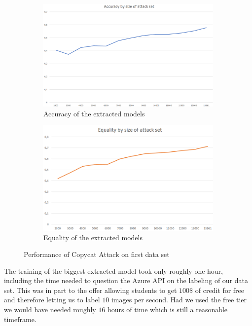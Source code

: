 \documentclass[a4paper,11pt]{article}
\begin{document}
        \begin{figure}[h!]
            \centering
            \begin{subfigure}[c]{0.49\textwidth}
                \centering
                \includegraphics[width=1\textwidth]{exercise_3/paper/images/accuracy_copy_Azure.png}
                \caption{Accuracy of the extracted models}
                \label{fig:Accuracy_Azure}
            \end{subfigure}
            \begin{subfigure}[c]{0.49\textwidth}
                \centering
                \includegraphics[width=1\textwidth]{exercise_3/paper/images/equality_copy_Azure.png}
                \caption{Equality of the extracted models}
                \label{fig:Equality_Azure}
            \end{subfigure}
            \caption{Performance of Copycat Attack on first data set}
            \label{fig:performance-azure}
        \end{figure}
        The training of the biggest extracted model took only roughly one hour, including the time needed to question the Azure API on the labeling of our data set. This was in part to the offer allowing students to get $100$\$ of credit for free and therefore letting us to label $10$ images per second. Had we used the free tier we would have needed roughly $16$ hours of time which is still a reasonable timeframe.
    
\end{document}

